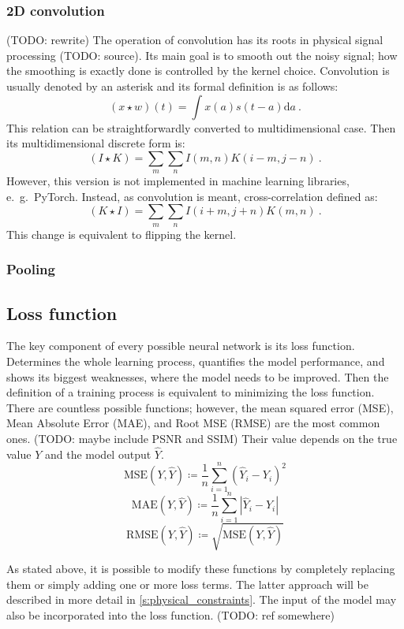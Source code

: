 \subsubsection{2D convolution}
(TODO: rewrite)
The operation of convolution has its roots in physical signal processing (TODO: source).
Its main goal is to smooth out the noisy signal; how the smoothing is exactly done is controlled by the kernel choice.
Convolution is usually denoted by an asterisk and its formal definition is as follows:
$$(x \star w)(t) = \int x(a)s(t-a) \mathrm{d}a \ .$$
This relation can be straightforwardly converted to multidimensional case.
Then its multidimensional discrete form is:
$$(I \star K) = \sum_m\sum_nI(m, n)K(i-m, j-n) \ .$$
However, this version is not implemented in machine learning libraries, e.\ g.\ PyTorch.
Instead, as convolution is meant, cross-correlation defined as:
$$(K \star I) = \sum_m\sum_nI(i+m, j+n)K(m, n) \ .$$
This change is equivalent to flipping the kernel. \cite{Goodfellow2016}

\subsubsection{Pooling}

\subsection{Loss function}

The key component of every possible neural network is its loss function.
Determines the whole learning process, quantifies the model performance, and shows its biggest weaknesses, where the model needs to be improved.
Then the definition of a training process is equivalent to minimizing the loss function.
There are countless possible functions; however, the mean squared error (MSE), Mean Absolute Error (MAE), and Root MSE (RMSE) are the most common ones. (TODO: maybe include PSNR and SSIM)
Their value depends on the true value $Y$ and the model output $\hat{Y}$.
$$
\text{MSE}(Y, \hat{Y}) \coloneqq \frac{1}{n} \sum_{i=1}^n \left( \hat{Y}_i - Y_i \right)^2
$$
$$
\text{MAE}(Y, \hat{Y}) \coloneqq \frac{1}{n} \sum_{i=1}^n  \left| \hat{Y}_i - Y_i \right|$$
$$
\text{RMSE}(Y, \hat{Y}) \coloneqq \sqrt{\text{MSE}(Y, \hat{Y})}
$$

As stated above, it is possible to modify these functions by completely replacing them or simply adding one or more loss terms.
The latter approach will be described in more detail in \ref{s:physical_constraints}.
The input of the model may also be incorporated into the loss function. (TODO: ref somewhere)

